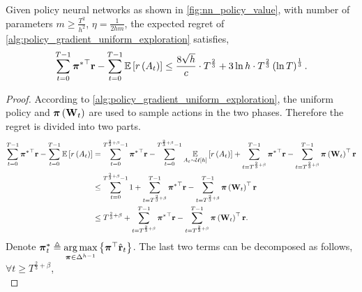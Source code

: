 \begin{thm}
\label{thm:policy_gradient_main_result}
    Given policy neural networks as shown in \cref{fig:nn_policy_value}, with number of parameters $m \ge \frac{T^2}{h^2}$, $\eta = \frac{1}{2 h m}$, the expected regret of \cref{alg:policy_gradient_uniform_exploration} satisfies,
\begin{equation*}
\begin{split}
    \sum\limits_{t=0}^{T-1}{ {{\boldsymbol{\pi}}^*}^\top {\mathbf{r}} } - \sum\limits_{t=0}^{T-1}{ {\mathbb{E}} \left[ r\left(A_t\right) \right] } \le \frac{8 \sqrt{h}}{c} \cdot T^{\frac{2}{3}} + 3 \ln{h} \cdot T^{\frac{2}{3}} \left(\ln{T}\right)^{\frac{1}{3}}.
\end{split}
\end{equation*}
\end{thm}
\begin{proof}
According to \cref{alg:policy_gradient_uniform_exploration}, the uniform policy and ${\boldsymbol{\pi}}\left( {\mathbf{W}}_t \right)$ are used to sample actions in the two phases. Therefore the regret is divided into two parts.
\begin{equation}
\label{eq:total_regret_decomposition}
\begin{split}
    \sum\limits_{t=0}^{T-1}{ {{\boldsymbol{\pi}}^*}^\top {\mathbf{r}} } - \sum\limits_{t=0}^{T-1}{ {\mathbb{E}} \left[ r\left(A_t\right) \right] } &= \sum\limits_{t=0}^{T^{\frac{2}{3} + \beta} - 1}{ {{\boldsymbol{\pi}}^*}^\top {\mathbf{r}}} - \sum\limits_{t=0}^{T^{\frac{2}{3} + \beta} - 1}{ \operatorname*{{\mathbb{E}}}\limits_{A_t \sim {\mathcal{U}}\left[h\right]}{ \left[ r\left(A_t\right) \right] }} + \sum\limits_{t=T^{\frac{2}{3} + \beta}}^{T-1}{ {{\boldsymbol{\pi}}^*}^\top {\mathbf{r}} }  - \sum\limits_{t=T^{\frac{2}{3} + \beta}}^{T-1}{ {\boldsymbol{\pi}}\left( {\mathbf{W}}_t \right)^\top {\mathbf{r}} } \\
    &\le \sum\limits_{t=0}^{T^{\frac{2}{3} + \beta} - 1}{1} + \sum\limits_{t=T^{\frac{2}{3} + \beta}}^{T-1}{ {{\boldsymbol{\pi}}^*}^\top {\mathbf{r}} } - \sum\limits_{t=T^{\frac{2}{3} + \beta}}^{T-1}{ {\boldsymbol{\pi}}\left( {\mathbf{W}}_t \right)^\top {\mathbf{r}} } \\
    &\le T^{\frac{2}{3} + \beta} + \sum\limits_{t=T^{\frac{2}{3} + \beta}}^{T-1}{ {{\boldsymbol{\pi}}^*}^\top {\mathbf{r}} } - \sum\limits_{t=T^{\frac{2}{3} + \beta}}^{T-1}{ {\boldsymbol{\pi}}\left( {\mathbf{W}}_t \right)^\top {\mathbf{r}} }.
\end{split}
\end{equation}
Denote ${\boldsymbol{\pi}}_t^* \triangleq \operatorname*{arg\,max}\limits_{{\boldsymbol{\pi}} \in \Delta^{h-1}}{\left\{ {\boldsymbol{\pi}}^\top \hat{{\mathbf{r}}}_t\right\}}$. The last two terms can be decomposed as follows, $\forall t \ge T^{\frac{2}{3} + \beta}$,
\begin{equation}
\label{eq:playing_learning_phase_regret_decomposition}

\end{equation}
\end{proof}
